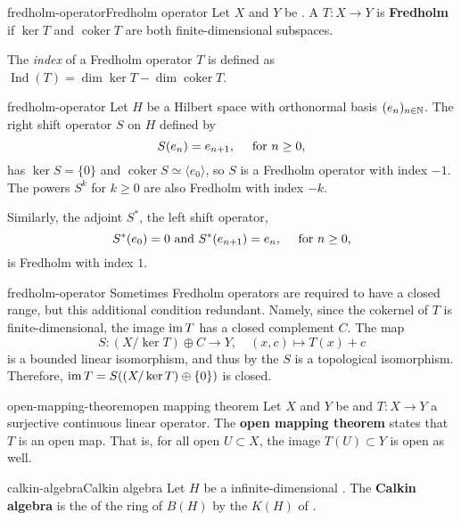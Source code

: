 \begin{topic}{fredholm-operator}{Fredholm operator}
    Let $X$ and $Y$ be . A  $T : X \to Y$ is \textbf{Fredholm} if $\ker T$ and $\operatorname{coker} T$ are both finite-dimensional subspaces.
    
    The \textit{index} of a Fredholm operator $T$ is defined as $\operatorname{Ind}(T) = \dim \ker T - \dim \operatorname{coker} T$.
\end{topic}

\begin{example}{fredholm-operator}
    Let $H$ be a Hilbert space with orthonormal basis $(e_n)_{n \in \mathbb{N}}$. The right shift operator $S$ on $H$ defined by
    \[ S(e_n) = e_{n + 1}, \quad \textup{ for } n \ge 0 , \]
    has $\ker S = \{ 0 \}$ and $\operatorname{coker} S \simeq \langle e_0 \rangle$, so $S$ is a Fredholm operator with index $-1$. The powers $S^k$ for $k \ge 0$ are also Fredholm with index $-k$.
    
    Similarly, the adjoint $S^*$, the left shift operator,
    \[ S^*(e_0) = 0 \text{ and } S^*(e_{n + 1}) = e_n, \quad \textup { for } n \ge 0 , \]
    is Fredholm with index $1$.
\end{example}

\begin{example}{fredholm-operator}
    Sometimes Fredholm operators are required to have a closed range, but this additional condition redundant. Namely, since the cokernel of $T$ is finite-dimensional, the image $\operatorname{im} T$ has a closed complement $C$. The map
    \[ S : (X / \ker T) \oplus C \to Y, \quad (x, c) \mapsto T(x) + c \]
    is a bounded linear isomorphism, and thus by the  $S$ is a topological isomorphism. Therefore, $\operatorname{im} T = S((X / \ker T) \oplus \{ 0 \})$ is closed.
\end{example}

\begin{topic}{open-mapping-theorem}{open mapping theorem}
    Let $X$ and $Y$ be  and $T : X \to Y$ a surjective continuous linear operator. The \textbf{open mapping theorem} states that $T$ is an open map. That is, for all open $U \subset X$, the image  $T(U) \subset Y$ is open as well.
\end{topic}

\begin{topic}{calkin-algebra}{Calkin algebra}
    Let $H$ be a  infinite-dimensional . The \textbf{Calkin algebra} is the  of the ring of  $B(H)$ by the  $K(H)$ of .
\end{topic}
